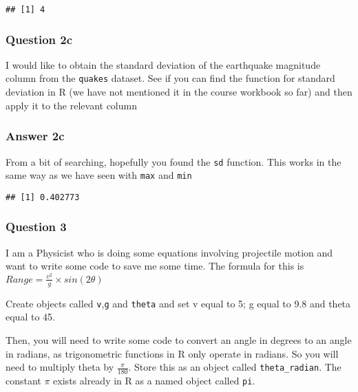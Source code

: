 \documentclass[
]{article}
\newenvironment{Shaded}{\begin{snugshade}}{\end{snugshade}}
\newcommand{\KeywordTok}[1]{\textcolor[rgb]{0.13,0.29,0.53}{\textbf{#1}}}
\newcommand{\NormalTok}[1]{#1}
\newcommand{\OperatorTok}[1]{\textcolor[rgb]{0.81,0.36,0.00}{\textbf{#1}}}
\begin{document}
\begin{verbatim}
## [1] 4
\end{verbatim}

\hypertarget{question-2c}{%
\subsubsection{Question 2c}\label{question-2c}}

I would like to obtain the standard deviation of the earthquake
magnitude column from the \texttt{quakes} dataset. See if you can find
the function for standard deviation in R (we have not mentioned it in
the course workbook so far) and then apply it to the relevant column

\hypertarget{answer-2c}{%
\subsubsection{Answer 2c}\label{answer-2c}}

From a bit of searching, hopefully you found the \texttt{sd} function.
This works in the same way as we have seen with \texttt{max} and
\texttt{min}

\begin{Shaded}
\end{Shaded}

\begin{verbatim}
## [1] 0.402773
\end{verbatim}

\hypertarget{question-3}{%
\subsubsection{Question 3}\label{question-3}}

I am a Physicist who is doing some equations involving projectile motion
and want to write some code to save me some time. The formula for this
is \(Range = \frac{v^{2}} {g} \times sin(2 \theta)\)

Create objects called \texttt{v},\texttt{g} and \texttt{theta} and set v
equal to 5; g equal to 9.8 and theta equal to 45.

Then, you will need to write some code to convert an angle in degrees to
an angle in radians, as trigonometric functions in R only operate in
radians. So you will need to multiply theta by \(\frac{\pi} {180}\).
Store this as an object called \texttt{theta\_radian}. The constant
\(\pi\) exists already in R as a named object called \texttt{pi}.
\end{document}
